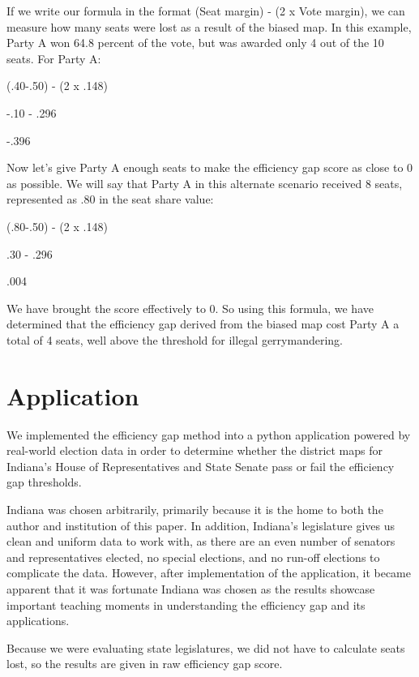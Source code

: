 \documentclass[sigconf]{acmart}
\begin{document}
If we write our formula in the format (Seat margin) - (2 x Vote margin), we can measure how many seats were lost as a result of the biased map. In this example, Party A won 64.8 percent of the vote, but was awarded only 4 out of the 10 seats. For Party A:

\begin{center}
    (.40-.50) - (2 x .148)
    
    -.10 - .296
    
    -.396
\end{center}

Now let's give Party A enough seats to make the efficiency gap score as close to 0 as possible. We will say that Party A in this alternate scenario received 8 seats, represented as .80 in the seat share value:

\begin{center}
    (.80-.50) - (2 x .148)
    
    .30 - .296
    
    .004
\end{center}

We have brought the score effectively to 0. So using this formula, we have determined that the efficiency gap derived from the biased map cost Party A a total of 4 seats, well above the threshold for illegal gerrymandering.

\section{Application}

We implemented the efficiency gap method into a python application powered by real-world election data in order to determine whether the district maps for Indiana's House of Representatives and State Senate pass or fail the efficiency gap thresholds. 

Indiana was chosen arbitrarily, primarily because it is the home to both the author and institution of this paper. In addition, Indiana's legislature gives us clean and uniform data to work with, as there are an even number of senators and representatives elected, no special elections, and no run-off elections to complicate the data. However, after implementation of the application, it became apparent that it was fortunate Indiana was chosen as the results showcase important teaching moments in understanding the efficiency gap and its applications.

Because we were evaluating state legislatures, we did not have to calculate seats lost, so the results are given in raw efficiency gap score. 
\end{document}
